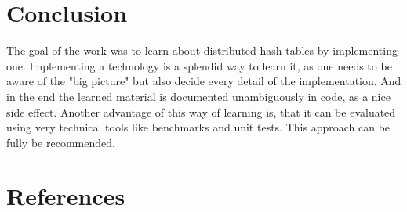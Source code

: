\documentclass[a4paper, 12pt]{article} %
\begin{document}
\newpage
\section{Conclusion}


The goal of the work was to learn about distributed hash tables by implementing one. Implementing a technology is a splendid way to learn it, as one needs to be aware of the "big picture" but also decide every detail of the implementation. And in the end the learned material is documented unambiguously in code, as a nice side effect. Another advantage of this way of learning is, that it can be evaluated using very technical tools like benchmarks and unit tests. This approach can be fully be recommended.




\newpage
\section{References}
\printbibliography[heading=none]
\end{document}
